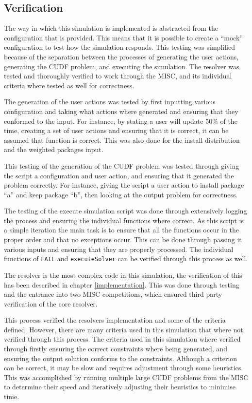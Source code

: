 \subsection{Verification}
The way in which this simulation is implemented is abstracted from the configuration that is provided.
This means that it is possible to create a ``mock'' configuration to test how the simulation responds.
This testing was simplified because of the separation between the processes of generating the user actions, generating the CUDF problem, and executing the simulation.
The resolver was tested and thoroughly verified to work through the MISC, and its individual criteria where tested as well for correctness.

The generation of the user actions was tested by first inputting various configuration and taking what actions where generated and ensuring that they conformed to the input.
For instance, by stating a user will update 50\% of the time, creating a set of user actions and ensuring that it is correct, it can be assumed that function is correct.
This was also done for the install distribution and the weighted packages input.

This testing of the generation of the CUDF problem was tested through giving the script a configuration and user action, and ensuring that it generated the problem correctly. 
For instance, giving the script a user action to install package ``a'' and keep package ``b'', then looking at the output problem for correctness.

The testing of the execute simulation script was done through extensively logging the process and ensuring the individual functions where correct.
As this script is a simple iteration the main task is to ensure that all the functions occur in the proper order and that no exceptions occur.
This can be done through passing it various inputs and ensuring that they are properly processed.
The individual functions of \verb+FAIL+ and \verb+executeSolver+ can be verified through this process as well.


The resolver is the most complex code in this simulation, the verification of this has been described in chapter \ref{implementation}.
This was done through testing and the entrance into two MISC competitions, which ensured third party verification of the core resolver.

This process verified the resolvers implementation and some of the criteria defined.
However, there are many criteria used in this simulation that where not verified through this process.
The criteria used in this simulation where verified through firstly ensuring the correct constraints where being generated, 
and ensuring the output solution conforms to the constraints.
Although a criterion can be correct, it may be slow and requires adjustment through some heuristics.
This was accomplished by running multiple large CUDF problems from the MISC to determine their speed and iteratively adjusting their heuristics to minimise time. 

